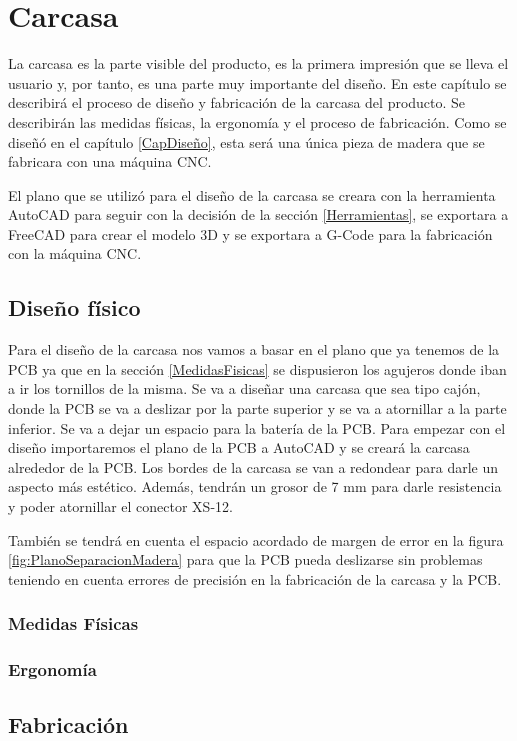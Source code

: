 \chapter{Carcasa}

La carcasa es la parte visible del producto, es la primera impresión que se lleva el usuario y, por tanto, es una parte muy importante del diseño. En este capítulo se describirá el proceso de diseño y fabricación de la carcasa del producto. Se describirán las medidas físicas, la ergonomía y el proceso de fabricación. Como se diseñó en el capítulo \ref{CapDiseño}, esta será una única pieza de madera que se fabricara con una máquina \gls{CNC}.

El plano que se utilizó para el diseño de la carcasa se creara con la herramienta AutoCAD para seguir con la decisión de la sección \ref{Herramientas}, se exportara a FreeCAD para crear el modelo 3D y se exportara a G-Code para la fabricación con la máquina \gls{CNC}.

\section{Diseño físico}
Para el diseño de la carcasa nos vamos a basar en el plano que ya tenemos de la \gls{PCB} ya que en la sección \ref{MedidasFisicas} se dispusieron los agujeros donde iban a ir los tornillos de la misma. Se va a diseñar una carcasa que sea tipo cajón, donde la \gls{PCB} se va a deslizar por la parte superior y se va a atornillar a la parte inferior. Se va a dejar un espacio para la batería de la \gls{PCB}. Para empezar con el diseño importaremos el plano de la \gls{PCB} a AutoCAD y se creará la carcasa alrededor de la \gls{PCB}. Los bordes de la carcasa se van a redondear para darle un aspecto más estético. Además, tendrán un grosor de 7 mm para darle resistencia y poder atornillar el conector XS-12.

También se tendrá en cuenta el espacio acordado de margen de error en la figura \ref{fig:PlanoSeparacionMadera} para que la \gls{PCB} pueda deslizarse sin problemas teniendo en cuenta errores de precisión en la fabricación de la carcasa y la \gls{PCB}.

\subsection{Medidas Físicas}
\subsection{Ergonomía}
\section{Fabricación}